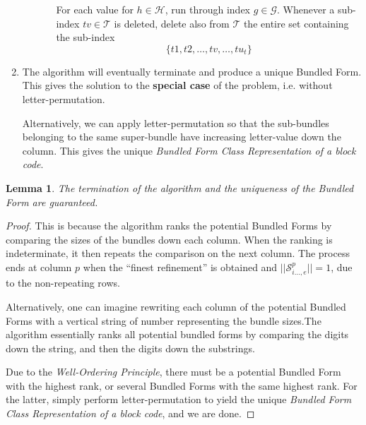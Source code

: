 \documentclass[12pt]{article}  %
\newtheorem{lemma}{Lemma}
\begin{document}
\begin{enumerate}
\begin{enumerate}
\begin{enumerate}
For each value for $h\in \mathcal{H}$, run through index $g \in \mathcal{G}$. Whenever a sub-index $tv \in \mathcal{T}$ is deleted, delete also from $\mathcal{T}$ the entire set containing the sub-index
$$\{t1, t2, \dots, tv, \dots, tu_t \}$$


\end{enumerate}


\end{enumerate}





\item The algorithm will eventually terminate and produce a unique Bundled Form. This gives the solution to the \textbf{special case} of the problem, i.e. without letter-permutation.

Alternatively, we can apply letter-permutation so that the sub-bundles belonging to the same super-bundle have increasing letter-value down the column. This gives the unique \emph{Bundled Form Class Representation of a block code}.


\end{enumerate}







\begin{lemma}\label{lem:uniq}
The termination of the algorithm and the uniqueness of the Bundled Form are guaranteed.
\end{lemma}
\begin{proof}
This is because the algorithm ranks the potential Bundled Forms by comparing the sizes of the bundles down each column. When the ranking is indeterminate, it then repeats the comparison on the next column. The process ends at column $p$ when the ``finest refinement'' is obtained and $||\mathcal{S}^{p}_{i \dots,e}||=1$, due to the non-repeating rows. 


Alternatively, one can imagine rewriting each column of the potential Bundled Forms with a vertical string of number representing the bundle sizes.The algorithm essentially ranks all potential bundled forms by comparing the digits down the string, and then the digits down the substrings.

Due to the \emph{Well-Ordering Principle}, there must be a potential Bundled Form with the highest rank, or several Bundled Forms with the same highest rank. For the latter, simply perform letter-permutation to yield the unique \emph{Bundled Form Class Representation of a block code}, and we are done.
\end{proof}
\end{document}
